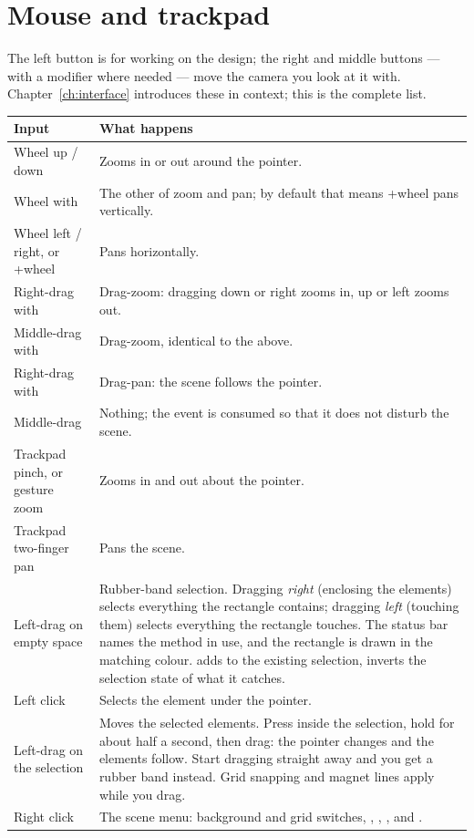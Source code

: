 \section{Mouse and trackpad}

The left button is for working on the design; the right and middle buttons ---
with a modifier where needed --- move the camera you look at it with.
Chapter~\ref{ch:interface} introduces these in context; this is the complete
list.

\begin{center}\small
\begin{tabular}{@{}L{4.8cm}L{10.0cm}@{}}
\toprule
\textbf{Input} & \textbf{What happens} \\
\midrule
Wheel up / down & Zooms in or out around the pointer. \\
Wheel with  & The other of zoom and pan; by default that means
+wheel pans vertically. \\
Wheel left / right, or +wheel & Pans horizontally. \\
Right-drag with  & Drag-zoom: dragging down or right zooms in, up or
left zooms out. \\
Middle-drag with  & Drag-zoom, identical to the above. \\
Right-drag with  & Drag-pan: the scene follows the pointer. \\
Middle-drag & Nothing; the event is consumed so that it does not disturb the
scene. \\
Trackpad pinch, or gesture zoom & Zooms in and out about the pointer. \\
Trackpad two-finger pan & Pans the scene. \\
\midrule
Left-drag on empty space & Rubber-band selection. Dragging \emph{right}
(enclosing the elements) selects everything the rectangle contains; dragging
\emph{left} (touching them) selects everything the rectangle touches. The
status bar names the method in use, and the rectangle is drawn in the matching
colour.  adds to the existing selection,  inverts the
selection state of what it catches. \\
Left click & Selects the element under the pointer. \\
Left-drag on the selection & Moves the selected elements. Press inside the
selection, hold for about half a second, then drag: the pointer changes and the
elements follow. Start dragging straight away and you get a rubber band
instead. Grid snapping and magnet lines apply while you drag. \\
Right click & The scene menu: background and grid switches, , , ,  and
. \\
\bottomrule
\end{tabular}
\end{center}

